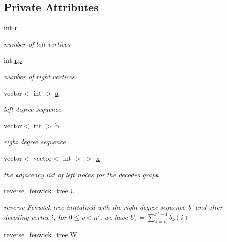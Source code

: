 \subsection*{Private Attributes}
\begin{DoxyCompactItemize}
\item 
int \hyperlink{classb__graph__decoder_a2caddd63df6808c95e2ee738f7c77870}{n}
\begin{DoxyCompactList}\small\item\em number of left vertices \end{DoxyCompactList}\item 
int \hyperlink{classb__graph__decoder_a7eca48cf8793e722d1b29dbdc9fd2dca}{np}
\begin{DoxyCompactList}\small\item\em number of right vertices \end{DoxyCompactList}\item 
vector$<$ int $>$ \hyperlink{classb__graph__decoder_afcf783e4199fb8f9d6828db08bb12333}{a}
\begin{DoxyCompactList}\small\item\em left degree sequence \end{DoxyCompactList}\item 
vector$<$ int $>$ \hyperlink{classb__graph__decoder_a12d1a4a91f342111d2116196cb826317}{b}
\begin{DoxyCompactList}\small\item\em right degree sequence \end{DoxyCompactList}\item 
vector$<$ vector$<$ int $>$ $>$ \hyperlink{classb__graph__decoder_a6bba2e67984f9733fc60c40dd4956587}{x}
\begin{DoxyCompactList}\small\item\em the adjacency list of left nodes for the decoded graph \end{DoxyCompactList}\item 
\hyperlink{classreverse__fenwick__tree}{reverse\+\_\+fenwick\+\_\+tree} \hyperlink{classb__graph__decoder_ae15e74088bb60a096562a9bdaf380f2c}{U}
\begin{DoxyCompactList}\small\item\em reverse Fenwick tree initialized with the right degree sequence b, and after decoding vertex $i$, for $0 \leq v <n'$, we have $U_v = \sum_{k=v}^{n'-1} b_k(i)$ \end{DoxyCompactList}\item 
\hyperlink{classreverse__fenwick__tree}{reverse\+\_\+fenwick\+\_\+tree} \hyperlink{classb__graph__decoder_a2c3f91db1f54ddfd411f74d18b01b606}{W}

\end{DoxyCompactItemize}

